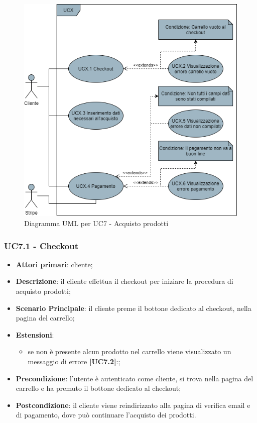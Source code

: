 \begin{figure}[H]
\centering
\includegraphics[scale=0.6]{res/UseCase/Immagini/AcquistoProdotti}
\caption{Diagramma UML per UC7 - Acquisto prodotti}
\end{figure}

\subsubsection{UC7.1 - Checkout}
\begin{itemize}
\item \textbf{Attori primari}: cliente;
\item \textbf{Descrizione}: il cliente effettua il checkout per iniziare la procedura di acquisto prodotti;
\item \textbf{Scenario Principale}: il cliente preme il bottone dedicato al checkout, nella pagina del carrello;
\item \textbf{Estensioni}:
\begin{itemize}
\item se non è presente alcun prodotto nel carrello viene visualizzato un messaggio di errore \textbf{[UC7.2]}:;
\end{itemize}
\item \textbf{Precondizione}: l'utente è autenticato come cliente, si trova nella pagina del carrello e ha premuto il bottone dedicato al checkout;
\item \textbf{Postcondizione}: il cliente viene reindirizzato alla pagina di verifica email e di pagamento, dove può continuare l'acquisto dei prodotti.
\end{itemize}

